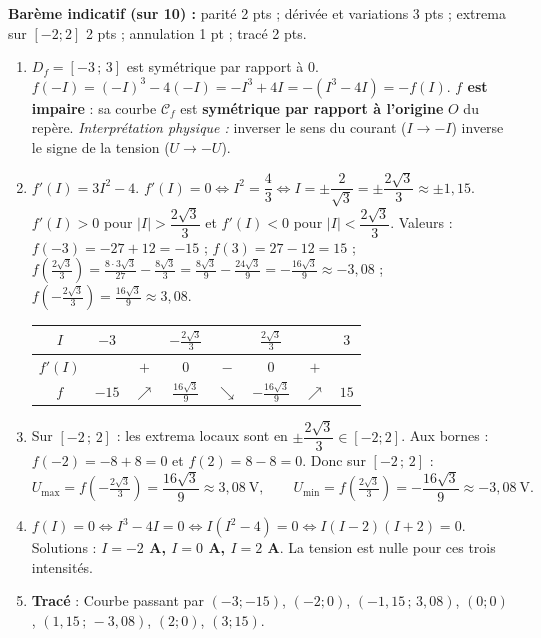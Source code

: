 \documentclass[11pt]{article}
\begin{document}
\begin{corrige}
\textbf{Barème indicatif (sur 10) :} parité 2 pts ; dérivée et variations 3 pts ; extrema sur $[-2;2]$ 2 pts ; annulation 1 pt ; tracé 2 pts.
\begin{enumerate}
    \item $D_f=[-3\,;\,3]$ est symétrique par rapport à $0$.
    $f(-I)=(-I)^3-4(-I)=-I^3+4I=-(I^3-4I)=-f(I)$.
    \textbf{$f$ est impaire} : sa courbe $\mathcal{C}_f$ est \textbf{symétrique par rapport à l'origine} $O$ du repère.
    \emph{Interprétation physique :} inverser le sens du courant ($I\to -I$) inverse le signe de la tension ($U\to -U$).
    \item $f'(I)=3I^2-4$.
    $f'(I)=0 \iff I^2=\dfrac{4}{3} \iff I=\pm\dfrac{2}{\sqrt{3}}=\pm\dfrac{2\sqrt{3}}{3}\approx \pm 1{,}15$.
    $f'(I)>0$ pour $|I|>\dfrac{2\sqrt3}{3}$ et $f'(I)<0$ pour $|I|<\dfrac{2\sqrt3}{3}$.
    Valeurs :
    $f(-3)=-27+12=-15$ ; $f(3)=27-12=15$ ;
    $f\left(\tfrac{2\sqrt3}{3}\right)=\tfrac{8\cdot 3\sqrt3}{27}-\tfrac{8\sqrt3}{3}=\tfrac{8\sqrt3}{9}-\tfrac{24\sqrt3}{9}=-\tfrac{16\sqrt3}{9}\approx -3{,}08$ ;
    $f\left(-\tfrac{2\sqrt3}{3}\right)=\tfrac{16\sqrt3}{9}\approx 3{,}08$.
    \begin{center}
    \begin{tabular}{|c|ccccccc|}\hline
    $I$ & $-3$ & & $-\frac{2\sqrt3}{3}$ & & $\frac{2\sqrt3}{3}$ & & $3$ \\ \hline
    $f'(I)$ & & $+$ & $0$ & $-$ & $0$ & $+$ & \\ \hline
    $f$ & $-15$ & $\nearrow$ & $\frac{16\sqrt3}{9}$ & $\searrow$ & $-\frac{16\sqrt3}{9}$ & $\nearrow$ & $15$ \\ \hline
    \end{tabular}
    \end{center}
    \item Sur $[-2\,;\,2]$ : les extrema locaux sont en $\pm\dfrac{2\sqrt3}{3}\in[-2;2]$.
    Aux bornes : $f(-2)=-8+8=0$ et $f(2)=8-8=0$.
    Donc sur $[-2\,;\,2]$ :
    \[ U_{\max}=f\left(-\tfrac{2\sqrt3}{3}\right)=\frac{16\sqrt3}{9}\approx 3{,}08\ \text{V}, \qquad U_{\min}=f\left(\tfrac{2\sqrt3}{3}\right)=-\frac{16\sqrt3}{9}\approx -3{,}08\ \text{V}. \]
    \item $f(I)=0 \iff I^3-4I=0 \iff I(I^2-4)=0 \iff I(I-2)(I+2)=0$.
    Solutions : \textbf{$I=-2$ A, $I=0$ A, $I=2$ A}. La tension est nulle pour ces trois intensités.
    \item \textbf{Tracé} : Courbe passant par $(-3;-15)$, $(-2;0)$, $\left(-1{,}15\,;\,3{,}08\right)$, $(0;0)$, $\left(1{,}15\,;\,-3{,}08\right)$, $(2;0)$, $(3;15)$.

\end{enumerate}
\end{corrige}
\end{document}

